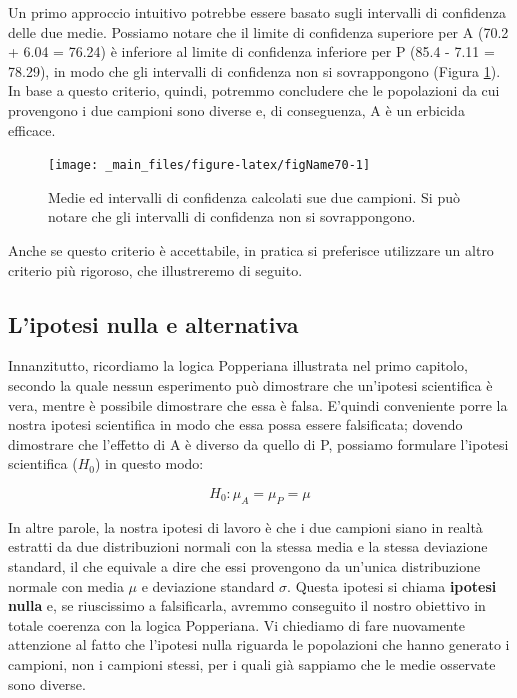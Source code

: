 \documentclass[a4paper,12pt,oneside]{book}
\begin{document}
Un primo approccio intuitivo potrebbe essere basato sugli intervalli di confidenza delle due medie. Possiamo notare che il limite di confidenza superiore per A (70.2 + 6.04 = 76.24) è inferiore al limite di confidenza inferiore per P (85.4 - 7.11 = 78.29), in modo che gli intervalli di confidenza non si sovrappongono (Figura \ref{fig:figName70}). In base a questo criterio, quindi, potremmo concludere che le popolazioni da cui provengono i due campioni sono diverse e, di conseguenza, A è un erbicida efficace.

\begin{figure}

{\centering \texttt{[image: \_main\_files/figure-latex/figName70-1]} 

}

\caption{Medie ed intervalli di confidenza calcolati sue due campioni. Si può notare che gli intervalli di confidenza non si sovrappongono.}\label{fig:figName70}
\end{figure}

Anche se questo criterio è accettabile, in pratica si preferisce utilizzare un altro criterio più rigoroso, che illustreremo di seguito.

\hypertarget{lipotesi-nulla-e-alternativa}{%
\subsection{L'ipotesi nulla e alternativa}\label{lipotesi-nulla-e-alternativa}}

Innanzitutto, ricordiamo la logica Popperiana illustrata nel primo capitolo, secondo la quale nessun esperimento può dimostrare che un'ipotesi scientifica è vera, mentre è possibile dimostrare che essa è falsa. E'quindi conveniente porre la nostra ipotesi scientifica in modo che essa possa essere falsificata; dovendo dimostrare che l'effetto di A è diverso da quello di P, possiamo formulare l'ipotesi scientifica (\(H_0\)) in questo modo:

\[H_0: \mu_A = \mu_P = \mu\]

In altre parole, la nostra ipotesi di lavoro è che i due campioni siano in realtà estratti da due distribuzioni normali con la stessa media e la stessa deviazione standard, il che equivale a dire che essi provengono da un'unica distribuzione normale con media \(\mu\) e deviazione standard \(\sigma\). Questa ipotesi si chiama \textbf{ipotesi nulla} e, se riuscissimo a falsificarla, avremmo conseguito il nostro obiettivo in totale coerenza con la logica Popperiana. Vi chiediamo di fare nuovamente attenzione al fatto che l'ipotesi nulla riguarda le popolazioni che hanno generato i campioni, non i campioni stessi, per i quali già sappiamo che le medie osservate sono diverse.
\end{document}
